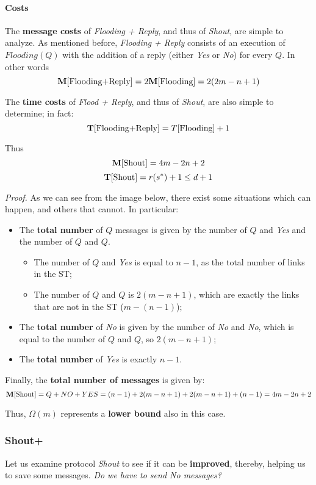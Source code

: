 \paragraph{Costs}
The \textbf{message costs} of \textit{Flooding + Reply}, and thus of \textit{Shout}, are simple to analyze. As mentioned before, \textit{Flooding + Reply} consists of an execution of $Flooding(Q)$ with the addition of a reply (either \textit{Yes} or \textit{No}) for every $Q$. In other words
$$\mathbf{M}[\text{Flooding+Reply}] = 2 \mathbf{M}[\text{Flooding}] = 2(2m - n +1)$$

The \textbf{time costs} of \textit{Flood + Reply}, and thus of \textit{Shout}, are also simple to determine; in fact:
$$\mathbf{T}[\text{Flooding+Reply}]= T[\text{Flooding}]+1$$

Thus
$$\mathbf{M}[\text{Shout}] = 4m - 2n + 2$$
$$\mathbf{T}[\text{Shout}] = r(s^*) + 1 \leq d + 1$$

\textit{Proof.} As we can see from the image below, there exist some situations which can happen, and others that cannot. In particular:
\begin{itemize}
    \item The \textbf{total number} of $Q$ messages is given by the number of $Q$ and \textit{Yes} and the number of $Q$ and $Q$.
    \begin{itemize}
        \item The number of $Q$ and \textit{Yes} is equal to $n-1$, as the total number of links in the ST;
        \item The number of $Q$ and $Q$ is $2(m - n + 1)$, which are exactly the links that are not in the ST ($m - (n-1)$);
    \end{itemize}
    
    \item The \textbf{total number} of \textit{No} is given by the number of \textit{No} and \textit{No}, which is equal to the number of $Q$ and $Q$, so $2(m - n + 1)$;
    \item The \textbf{total number} of \textit{Yes} is exactly $n-1$.
\end{itemize}


Finally, the \textbf{total number of messages} is given by:
$$
\mathbf{M}[\text{Shout}] = Q + NO + YES = (n-1) + 2(m-n+1) + 2(m-n+1) + (n-1) = 4m - 2n + 2
$$

Thus, $\Omega(m)$ represents a \textbf{lower bound} also in this case.

\subsubsection{Shout+}
Let us examine protocol \textit{Shout} to see if it can be \textbf{improved}, thereby, helping us to save some messages. \textit{Do we have to send No messages?}

